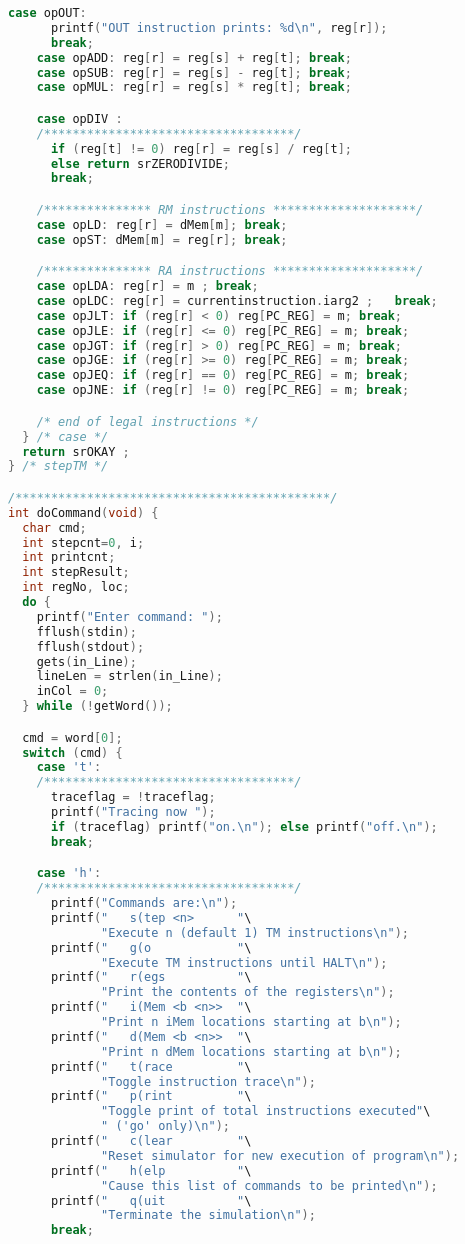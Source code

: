 \documentclass[lang=cn,10pt]{elegantbook}
\begin{document}
\begin{lstlisting}[caption={tm.c},language=c]
    case opOUT:  
      printf("OUT instruction prints: %d\n", reg[r]);
      break;
    case opADD: reg[r] = reg[s] + reg[t]; break;
    case opSUB: reg[r] = reg[s] - reg[t]; break;
    case opMUL: reg[r] = reg[s] * reg[t]; break;

    case opDIV :
    /***********************************/
      if (reg[t] != 0) reg[r] = reg[s] / reg[t];
      else return srZERODIVIDE;
      break;

    /*************** RM instructions ********************/
    case opLD: reg[r] = dMem[m]; break;
    case opST: dMem[m] = reg[r]; break;

    /*************** RA instructions ********************/
    case opLDA: reg[r] = m ; break;
    case opLDC: reg[r] = currentinstruction.iarg2 ;   break;
    case opJLT: if (reg[r] < 0) reg[PC_REG] = m; break;
    case opJLE: if (reg[r] <= 0) reg[PC_REG] = m; break;
    case opJGT: if (reg[r] > 0) reg[PC_REG] = m; break;
    case opJGE: if (reg[r] >= 0) reg[PC_REG] = m; break;
    case opJEQ: if (reg[r] == 0) reg[PC_REG] = m; break;
    case opJNE: if (reg[r] != 0) reg[PC_REG] = m; break;

    /* end of legal instructions */
  } /* case */
  return srOKAY ;
} /* stepTM */

/********************************************/
int doCommand(void) {
  char cmd;
  int stepcnt=0, i;
  int printcnt;
  int stepResult;
  int regNo, loc;
  do {
    printf("Enter command: ");
    fflush(stdin);
    fflush(stdout);
    gets(in_Line);
    lineLen = strlen(in_Line);
    inCol = 0;
  } while (!getWord());

  cmd = word[0];
  switch (cmd) {
    case 't':
    /***********************************/
      traceflag = !traceflag;
      printf("Tracing now ");
      if (traceflag) printf("on.\n"); else printf("off.\n");
      break;

    case 'h':
    /***********************************/
      printf("Commands are:\n");
      printf("   s(tep <n>      "\
             "Execute n (default 1) TM instructions\n");
      printf("   g(o            "\
             "Execute TM instructions until HALT\n");
      printf("   r(egs          "\
             "Print the contents of the registers\n");
      printf("   i(Mem <b <n>>  "\
             "Print n iMem locations starting at b\n");
      printf("   d(Mem <b <n>>  "\
             "Print n dMem locations starting at b\n");
      printf("   t(race         "\
             "Toggle instruction trace\n");
      printf("   p(rint         "\
             "Toggle print of total instructions executed"\
             " ('go' only)\n");
      printf("   c(lear         "\
             "Reset simulator for new execution of program\n");
      printf("   h(elp          "\
             "Cause this list of commands to be printed\n");
      printf("   q(uit          "\
             "Terminate the simulation\n");
      break;


\end{lstlisting}
\end{document}
